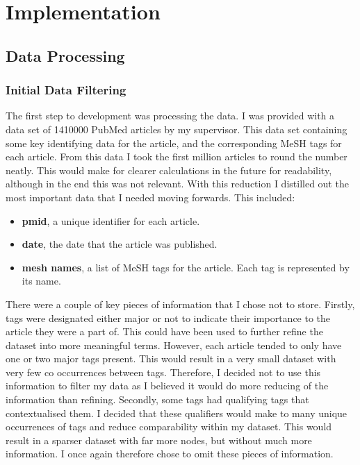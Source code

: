 \documentclass{l4proj}
\begin{document}
\chapter{Implementation}
\section{Data Processing}
\subsection{Initial Data Filtering}

The first step to development was processing the data. I was provided with a data set of 1410000 PubMed articles by my supervisor. This data set containing some key identifying data for the article, and the corresponding MeSH tags for each article. From this data I took the first million articles to round the number neatly. This would make for clearer calculations in the future for readability, although in the end this was not relevant. With this reduction I distilled out the most important data that I needed moving forwards. This included:
\\
\begin{itemize}
    \item \textbf{pmid}, a unique identifier for each article.
    \item \textbf{date}, the date that the article was published.
    \item \textbf{mesh names}, a list of MeSH tags for the article. Each tag is represented by its name. \\
\end{itemize}

There were a couple of key pieces of information that I chose not to store. Firstly, tags were designated either major or not to indicate their importance to the article they were a part of. This could have been used to further refine the dataset into more meaningful terms. However, each article tended to only have one or two major tags present. This would result in a very small dataset with very few co occurrences between tags. Therefore, I decided not to use this information to filter my data as I believed it would do more reducing of the information than refining. Secondly, some tags had qualifying tags that contextualised them. I decided that these qualifiers would make to many unique occurrences of tags and reduce comparability within my dataset. This would result in a sparser dataset with far more nodes, but without much more information. I once again therefore chose to omit these pieces of information.\\
\end{document}

